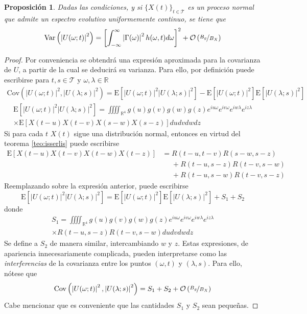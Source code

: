 \documentclass[12pt,letterpaper]{book}
\newtheorem{proposicion}[teorema]{Proposición}
\newcommand{\R}{\mathbb{R}}
\newcommand{\intR}{\int_{-\infty}^{\infty}}
\newcommand{\E}[1]{\mathrm{E}\left[ #1 \right]}
\newcommand{\Var}[1]{\mathrm{Var}\left( #1 \right)}
\newcommand{\Cov}[1]{\mathrm{Cov}\left( #1 \right)}
\newcommand{\abso}[1]{\left| #1 \right|}
\newcommand{\xt}{$\{X(t)\}_{t\in \mathcal{T}}$ }
\newcommand{\orden}[1]{\mathcal{O}\left( #1 \right)}
\newcommand{\pheq}{\phantom{=}}
\begin{document}
\begin{proposicion}
Dadas las condiciones, y si \xt es un proceso normal que admite un espectro evolutivo uniformemente continuo, se tiene que
\begin{equation}
\Var{\abso{U(\omega;t)}^{2}} = \left[ \intR \abso{\Gamma(\omega)}^{2} h(\omega, t)d\omega \right]^{2} + \orden{\nicefrac{B_g}{B_X}}
\end{equation}
\end{proposicion}


\begin{proof}
Por conveniencia se obtendrá una expresión aproximada para la covarianza de $U$, a partir de la cual se deducirá su varianza. 
%
Para ello, por definición puede escribirse para $t,s \in \mathcal{T}$ y $\omega, \lambda \in \R$
\begin{align*}
\Cov{\abso{U(\omega;t)}^{2},\abso{U(\lambda;s)}^{2}} =
\E{\abso{U(\omega;t)}^{2} \abso{U(\lambda;s)}^{2}} - 
\E{\abso{U(\omega;t)}^{2}} \E{\abso{U(\lambda;s)}^{2}}
\end{align*}
\begin{multline}
\E{\abso{U(\omega;t)}^{2} \abso{U(\lambda;s)}^{2}}
=
\iiiint_{\R^{4}} g(u) g(v) g(w) g(z) e^{i u \omega} e^{i v \omega} e^{i w \lambda} e^{i z \lambda} \\
 \times
\E{{X(t-u)} {X(t-v)} {X(s-w)} {X(s-z)}}
du dv dw dz 
\end{multline}
Si para cada $t$ $X(t)$ sigue una distribución normal, entonces en virtud del teorema \ref{teo:isserlis} puede escribirse
\begin{align*}
\E{X(t-u) {X(t-v)} {X(t-w)} X(t-z)} 
&=       R(t-u,t-v)R(s-w,s-z) \\
&\pheq + R(t-u,s-z)R(t-v,s-w) \\
&\pheq + R(t-u,s-w)R(t-v,s-z)
\end{align*}
Reemplazando sobre la expresión anterior, puede escribirse
\begin{equation}
\E{\abso{U(\omega;t)}^{2} \abso{U(\lambda;s)}^{2}} = \E{\abso{U(\omega;t)}^{2}} \E{\abso{U(\lambda;s)}^{2}}+ S_1 + S_2
\end{equation}
donde
\begin{multline*}
S_1 = \iiiint_{\R^{4}} g(u) g(v) g(w) g(z) e^{i u \omega} e^{i v \omega} e^{i w \lambda} e^{i z \lambda} \\
\times
R(t-u,s-z)R(t-v,s-w)
du dv dw dz 
\end{multline*}
Se define a $S_2$ de manera similar, intercambiando $w$ y $z$. 
%
Estas expresiones, de apariencia innecesariamente complicada, pueden interpretarse como las \textit{interferencias} de la covarianza entre los puntos $(\omega, t)$ y $(\lambda,s)$.
%
Para ello, nótese que
\begin{equation}
\Cov{\abso{U(\omega;t)}^{2},\abso{U(\lambda;s)}^{2}} = S_1 + S_2 + \orden{\nicefrac{B_g}{B_X}}
\end{equation}
%
Cabe mencionar que es conveniente que las cantidades $S_1$ y $S_2$ sean pequeñas.


\end{proof}
\end{document}
